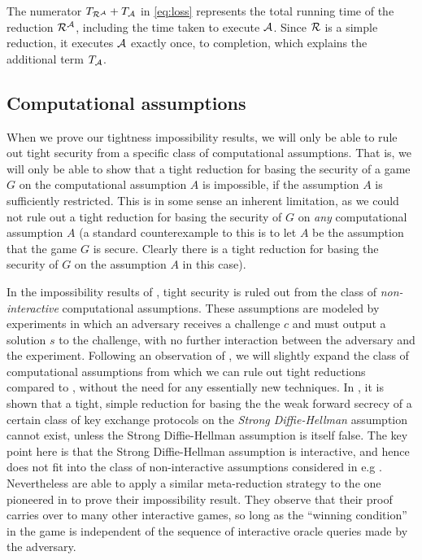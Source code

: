 \begin{remark}
  The numerator \(T_{\redR^{\advA}} + T_{\advA}\) in \eqref{eq:loss}
  represents the total running time of the reduction \(\redR^{\advA}\),
  including the time taken to execute \(\mathcal{A}\).
  Since \(\redR\) is a simple reduction,
  it executes \(\mathcal{A}\) exactly once, to completion,
  which explains the additional term \(T_{\mathcal{A}}\).
\end{remark}

\subsection{Computational assumptions}

When we prove our tightness impossibility results,
we will only be able to rule out tight security
from a specific class of computational assumptions.
That is, we will only be able to show that
a tight reduction for basing the security of a game \(G\)
on the computational assumption \(A\) is impossible,
if the assumption \(A\) is sufficiently restricted.
This is in some sense an inherent limitation,
as we could not rule out a tight reduction
for basing the security of \(G\)
on \emph{any} computational assumption \(A\)
(a standard counterexample to this is to let \(A\) be the assumption that the game \(G\) is secure.
Clearly there is a tight reduction
for basing the security of \(G\) on the assumption \(A\) in this case).

In the impossibility results of ,
tight security is ruled out from the class of \emph{non-interactive}
computational assumptions.
These assumptions are modeled by experiments in which an adversary receives a challenge \(c\)
and must output a solution \(s\) to the challenge, with no further interaction between the adversary and the experiment.
Following an observation of , we will slightly expand the class of computational assumptions
from which we can rule out tight reductions
compared to , without the need for any essentially new techniques.
In , it is shown that a tight, simple reduction
for basing the the weak forward secrecy of a certain class of key exchange protocols
on the \emph{Strong Diffie-Hellman} assumption
cannot exist, unless the Strong Diffie-Hellman assumption is itself false.
The key point here is that the Strong Diffie-Hellman assumption is interactive,
and hence does not fit into the class of non-interactive assumptions considered in e.g .
Nevertheless  are able to apply a similar meta-reduction strategy
to the one pioneered in  to prove their impossibility result.
They observe that their proof carries over to many other
interactive games, so long as the ``winning condition''
in the game is independent of the sequence of interactive oracle queries made by the adversary.

